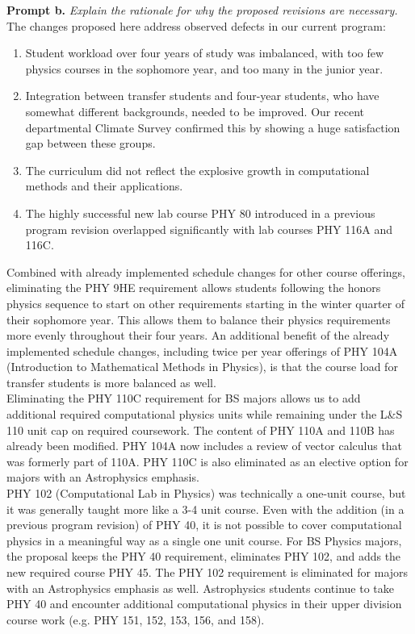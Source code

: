 \documentclass[12pt]{article}
\begin{document}
\noindent
{\bf Prompt b.} {\it Explain the rationale for why the proposed revisions are necessary.}\\[4pt]

\noindent
The changes proposed here address observed defects in our current program:
\begin{enumerate}
\item  Student workload over four years of study was imbalanced, with too few
  physics courses in the sophomore year, and too many in the junior
  year.
\item Integration between transfer students and four-year students,
  who have somewhat different backgrounds, needed to be improved. Our
  recent departmental Climate Survey confirmed this by showing a huge
  satisfaction gap between these groups.
\item The curriculum did not reflect the explosive growth in
  computational methods and their applications.
\item The highly successful new lab course PHY 80 introduced in a
  previous program revision overlapped significantly with lab courses
  PHY 116A and 116C.
\end{enumerate}

\noindent
Combined with already implemented schedule changes for other course
offerings, eliminating the PHY 9HE requirement allows students following
the honors physics sequence to start on other requirements starting in
the winter quarter of their sophomore year.  This allows them to
balance their physics requirements more evenly throughout their four
years.  An additional benefit of the already implemented schedule changes,
including twice per year offerings of PHY 104A (Introduction to
Mathematical Methods in Physics), is that the course load for
transfer students is more balanced as well.\\

\noindent
Eliminating the PHY 110C requirement for BS majors allows us to add
additional required computational physics units while remaining under
the L\&S 110 unit cap on required coursework.  The content of PHY 110A
and 110B has already been modified.  PHY 104A now includes a review of
vector calculus that was formerly part of 110A.  PHY 110C is also
eliminated as an elective option for majors with an Astrophysics
emphasis.\\

\noindent
PHY 102 (Computational Lab in Physics) was technically a one-unit
course, but it was generally taught more like a 3-4 unit course.  Even
with the addition (in a previous program revision) of PHY 40, it is
not possible to cover computational physics in a meaningful way as a
single one unit course.  For BS Physics majors, the proposal keeps the
PHY 40 requirement, eliminates PHY 102, and adds the new required
course PHY 45.  The PHY 102 requirement is eliminated for
majors with an Astrophysics emphasis as well.  Astrophysics students
continue to take PHY 40 and encounter additional computational physics
in their upper division course work (e.g. PHY 151, 152, 153, 156, and
158).\\
\end{document}

